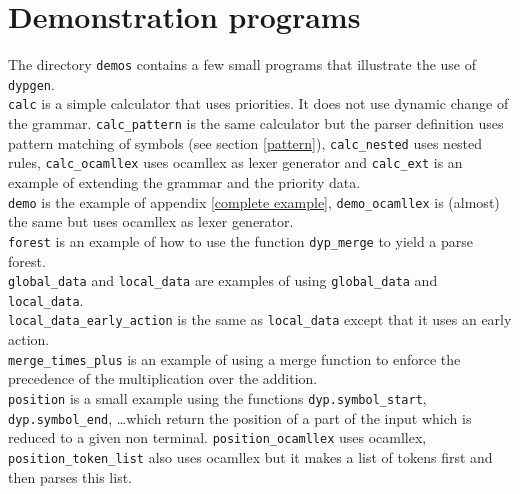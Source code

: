 \documentclass[12pt]{article}
\begin{document}
{%

\section{Demonstration programs}

The directory \verb|demos| contains a few small programs that illustrate the use of \verb|dypgen|.\\

\verb|calc| is a simple calculator that uses priorities. It does not use dynamic change of the grammar. \verb|calc_pattern| is the same calculator but the parser definition uses pattern matching of symbols (see section \ref{pattern}), \verb|calc_nested| uses nested rules, \verb|calc_ocamllex| uses ocamllex as lexer generator and \verb|calc_ext| is an example of extending the grammar and the priority data.\\

\verb|demo| is the example of appendix \ref{complete example}, \verb|demo_ocamllex| is (almost) the same but uses ocamllex as lexer generator.\\

\verb|forest| is an example of how to use the function \verb|dyp_merge| to yield a parse forest.\\

\verb|global_data| and \verb|local_data| are examples of using \verb|global_data| and \verb|local_data|.\\
\verb|local_data_early_action| is the same as \verb|local_data| except that it uses an early action.\\

\verb|merge_times_plus| is an example of using a merge function to enforce the precedence of the multiplication over the addition.\\

\verb|position| is a small example using the functions \verb|dyp.symbol_start|, \verb|dyp.symbol_end|, \ldots which return the position of a part of the input which is reduced to a given non terminal. \verb|position_ocamllex| uses ocamllex, \verb|position_token_list| also uses ocamllex but it makes a list of tokens first and then parses this list.\\

}
\end{document}
